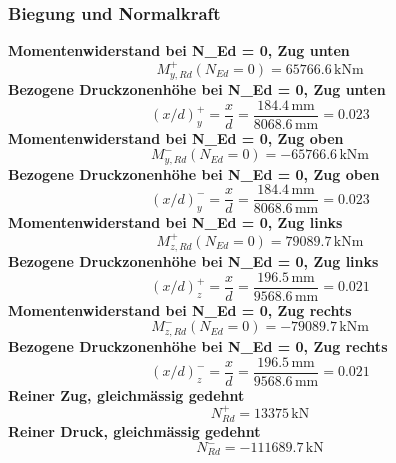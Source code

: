\documentclass[11pt,a4paper]{article}
\begin{document}
\subsubsection{Biegung und Normalkraft}
\noindent\textbf{Momentenwiderstand bei N\_Ed = 0, Zug unten}
\begin{equation*}
M_{y,Rd}^{+}(N_{Ed} = 0) = 65766.6\,\mathrm{kNm}
\end{equation*}
\noindent\textbf{Bezogene Druckzonenhöhe bei N\_Ed = 0, Zug unten}
\begin{equation*}
\left(x/d\right)_{y}^{+} = \frac{x}{d} = \frac{184.4\,\mathrm{mm}}{8068.6\,\mathrm{mm}} = 0.023
\end{equation*}
\noindent\textbf{Momentenwiderstand bei N\_Ed = 0, Zug oben}
\begin{equation*}
M_{y,Rd}^{-}(N_{Ed} = 0) = -65766.6\,\mathrm{kNm}
\end{equation*}
\noindent\textbf{Bezogene Druckzonenhöhe bei N\_Ed = 0, Zug oben}
\begin{equation*}
\left(x/d\right)_{y}^{-} = \frac{x}{d} = \frac{184.4\,\mathrm{mm}}{8068.6\,\mathrm{mm}} = 0.023
\end{equation*}
\noindent\textbf{Momentenwiderstand bei N\_Ed = 0, Zug links}
\begin{equation*}
M_{z,Rd}^{+}(N_{Ed} = 0) = 79089.7\,\mathrm{kNm}
\end{equation*}
\noindent\textbf{Bezogene Druckzonenhöhe bei N\_Ed = 0, Zug links}
\begin{equation*}
\left(x/d\right)_{z}^{+} = \frac{x}{d} = \frac{196.5\,\mathrm{mm}}{9568.6\,\mathrm{mm}} = 0.021
\end{equation*}
\noindent\textbf{Momentenwiderstand bei N\_Ed = 0, Zug rechts}
\begin{equation*}
M_{z,Rd}^{-}(N_{Ed} = 0) = -79089.7\,\mathrm{kNm}
\end{equation*}
\noindent\textbf{Bezogene Druckzonenhöhe bei N\_Ed = 0, Zug rechts}
\begin{equation*}
\left(x/d\right)_{z}^{-} = \frac{x}{d} = \frac{196.5\,\mathrm{mm}}{9568.6\,\mathrm{mm}} = 0.021
\end{equation*}
\noindent\textbf{Reiner Zug, gleichmässig gedehnt}
\begin{equation*}
N_{Rd}^{+} = 13375\,\mathrm{kN}
\end{equation*}
\noindent\textbf{Reiner Druck, gleichmässig gedehnt}
\begin{equation*}
N_{Rd}^{-} = -111689.7\,\mathrm{kN}
\end{equation*}
\end{document}
